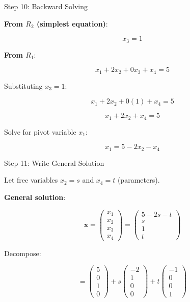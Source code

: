 \documentclass[10pt]{beamer}
\theoremstyle{definition}
\newcommand{\x}[1]{\alert{\textbf{#1}}}
\begin{document}
\begin{frame}{Step 10: Backward Solving}

\x{From $R_2$ (simplest equation)}:

$$x_3 = 1$$

\vspace{1em}

\x{From $R_1$}:

$$x_1 + 2x_2 + 0x_3 + x_4 = 5$$

Substituting $x_3 = 1$:

$$x_1 + 2x_2 + 0(1) + x_4 = 5$$

$$x_1 + 2x_2 + x_4 = 5$$

Solve for pivot variable $x_1$:

$$x_1 = 5 - 2x_2 - x_4$$

\end{frame}

\begin{frame}{Step 11: Write General Solution}

Let free variables $x_2 = s$ and $x_4 = t$ (parameters).

\vspace{0.5em}

\x{General solution}:

$$\mathbf{x} = \begin{pmatrix} x_1 \\ x_2 \\ x_3 \\ x_4 \end{pmatrix} = \begin{pmatrix} 5 - 2s - t \\ s \\ 1 \\ t \end{pmatrix}$$

\vspace{1em}

Decompose:

$$= \begin{pmatrix} 5 \\ 0 \\ 1 \\ 0 \end{pmatrix} + s\begin{pmatrix} -2 \\ 1 \\ 0 \\ 0 \end{pmatrix} + t\begin{pmatrix} -1 \\ 0 \\ 0 \\ 1 \end{pmatrix}$$

\end{frame}
\end{document}

